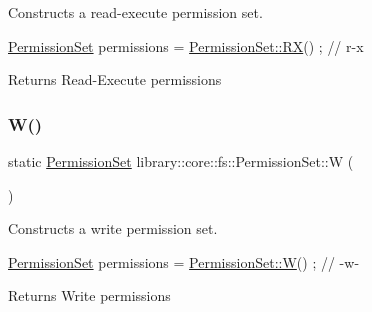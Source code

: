 Constructs a read-\/execute permission set. 


\begin{DoxyCode}
\hyperlink{classlibrary_1_1core_1_1fs_1_1PermissionSet_a8a6eb39cc2a8bca92a657d065d3e36ba}{PermissionSet} permissions = \hyperlink{classlibrary_1_1core_1_1fs_1_1PermissionSet_ab632d79f1b8b8f4577bc06fa622b1c09}{PermissionSet::RX}() ; \textcolor{comment}{// r-x}
\end{DoxyCode}


\begin{DoxyReturn}{Returns}
Read-\/\+Execute permissions 
\end{DoxyReturn}
\mbox{\label{classlibrary_1_1core_1_1fs_1_1PermissionSet_a7046fb1ae54d0308161a44eaf01b03e1}} 
\subsubsection{\texorpdfstring{W()}{W()}}
{\footnotesize\ttfamily static \hyperlink{classlibrary_1_1core_1_1fs_1_1PermissionSet}{Permission\+Set} library\+::core\+::fs\+::\+Permission\+Set\+::W (\begin{DoxyParamCaption}{ }\end{DoxyParamCaption})\hspace{0.3cm}{\ttfamily [static]}}



Constructs a write permission set. 


\begin{DoxyCode}
\hyperlink{classlibrary_1_1core_1_1fs_1_1PermissionSet_a8a6eb39cc2a8bca92a657d065d3e36ba}{PermissionSet} permissions = \hyperlink{classlibrary_1_1core_1_1fs_1_1PermissionSet_a7046fb1ae54d0308161a44eaf01b03e1}{PermissionSet::W}() ; \textcolor{comment}{// -w-}
\end{DoxyCode}


\begin{DoxyReturn}{Returns}
Write permissions 
\end{DoxyReturn}
\mbox{\label{classlibrary_1_1core_1_1fs_1_1PermissionSet_a7f4717643d0b80b0b98104c357b3322f}} 
